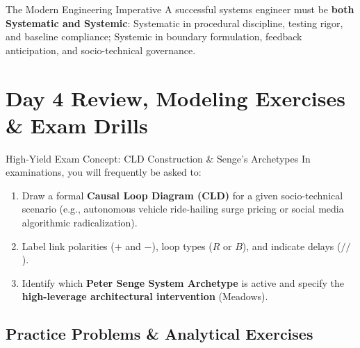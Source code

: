 \begin{takeawaybox}{The Modern Engineering Imperative}
A successful systems engineer must be \textbf{both Systematic and Systemic}: Systematic in procedural discipline, testing rigor, and baseline compliance; Systemic in boundary formulation, feedback anticipation, and socio-technical governance.
\end{takeawaybox}

\section{Day 4 Review, Modeling Exercises \& Exam Drills}
\label{sec:day4_exercises}

\begin{examprepbox}{High-Yield Exam Concept: CLD Construction \& Senge's Archetypes}
In examinations, you will frequently be asked to:
\begin{enumerate}[leftmargin=1.5em]
    \item Draw a formal \textbf{Causal Loop Diagram (CLD)} for a given socio-technical scenario (e.g., autonomous vehicle ride-hailing surge pricing or social media algorithmic radicalization).
    \item Label link polarities ($+$ and $-$), loop types ($R$ or $B$), and indicate delays ($//$).
    \item Identify which \textbf{Peter Senge System Archetype} is active and specify the \textbf{high-leverage architectural intervention} (Meadows).
\end{enumerate}
\end{examprepbox}

\subsection{Practice Problems \& Analytical Exercises}

